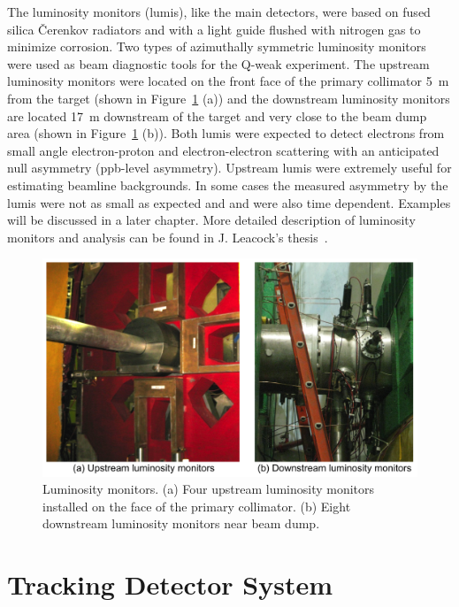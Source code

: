 The luminosity monitors (lumis), like the main detectors, were based on fused silica \v{C}erenkov radiators and with a light guide flushed with nitrogen gas to minimize corrosion. Two types of azimuthally symmetric luminosity monitors were used as beam diagnostic tools for the Q-weak experiment. The upstream luminosity monitors were located on the front face of the primary collimator 5~m from the target (shown in Figure~\ref{fig:lumi} (a)) and the downstream luminosity monitors are located 17~m downstream of the target and very close to the beam dump area (shown in Figure~\ref{fig:lumi} (b)). Both lumis were expected to detect electrons from small angle electron-proton and electron-electron scattering with an anticipated null asymmetry (ppb-level asymmetry). Upstream lumis were extremely useful for estimating beamline backgrounds. In some cases the measured asymmetry by the lumis were not as small as expected and and were also time dependent. Examples will be discussed in a later chapter. More detailed description of luminosity monitors and analysis can be found in J. Leacock's thesis~\cite{leacock_qweak}.


\begin{singlespace}
\begin{figure}[!h]
	\begin{center}
	\includegraphics[width=15.0cm]{figures/lumi}
	\caption
	{Luminosity monitors. (a) Four upstream luminosity monitors installed on the face of the primary collimator. (b) Eight downstream luminosity monitors near beam dump.}
	\label{fig:lumi}
	\end{center}
\end{figure}
\end{singlespace}


\section{Tracking Detector System}%
\label{Tracking Detector System}

